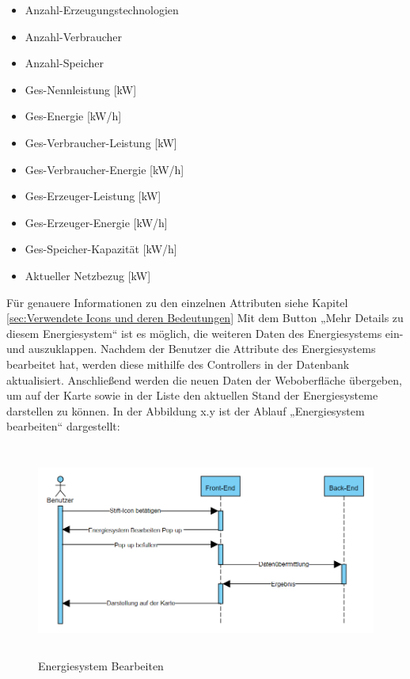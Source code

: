 \begin{itemize}
	\item Anzahl-Erzeugungstechnologien  
	\item Anzahl-Verbraucher
	\item Anzahl-Speicher
	\item Ges-Nennleistung [kW]
	\item Ges-Energie [kW/h]
	\item Ges-Verbraucher-Leistung [kW]
	\item Ges-Verbraucher-Energie [kW/h]
	\item Ges-Erzeuger-Leistung [kW]
	\item Ges-Erzeuger-Energie [kW/h]
	\item Ges-Speicher-Kapazität [kW/h]
	\item Aktueller Netzbezug [kW]
\end{itemize}

Für genauere Informationen zu den einzelnen Attributen siehe Kapitel  \ref{sec:Verwendete Icons und deren Bedeutungen}
Mit dem Button „Mehr Details zu diesem Energiesystem“ ist es möglich, die weiteren Daten des Energiesystems ein- und auszuklappen. 
Nachdem der Benutzer die Attribute des Energiesystems bearbeitet hat, werden diese mithilfe des Controllers in der Datenbank aktualisiert. Anschließend werden die neuen Daten der Weboberfläche übergeben, um auf der Karte sowie in der Liste den aktuellen Stand der Energiesysteme darstellen zu können. In der Abbildung x.y ist der Ablauf „Energiesystem bearbeiten“ dargestellt:
\newline
\begin{figure}[h]
	\centering
	\includegraphics[height=7cm,width=14cm]{images/ESbearbeiten}
	\caption{Energiesystem Bearbeiten}
	\label{fig:CSS_System}
\end{figure}



